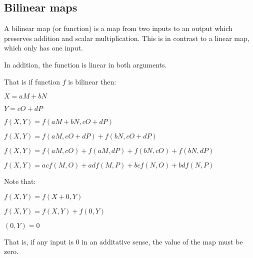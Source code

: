 
\subsection{Bilinear maps}

A bilinear map (or function) is a map from two inputs to an output which preserves addition and scalar multiplication. This is in contrast to a linear map, which only has one input.

In addition, the function is linear in both arguments.

That is if function \(f\) is bilinear then:

$X=aM+bN$

$Y=cO+dP$

$f(X,Y)=f(aM+bN,cO+dP)$

$f(X,Y)=f(aM,cO+dP)+f(bN,cO+dP)$

$f(X,Y)=f(aM,cO)+f(aM,dP)+f(bN,cO)+f(bN,dP)$

$f(X,Y)=acf(M,O)+adf(M,P)+bcf(N,O)+bdf(N,P)$

Note that:

$f(X,Y)=f(X+0,Y)$

$f(X,Y)=f(X,Y)+f(0,Y)$

$(0,Y)=0$

That is, if any input is \(0\) in an additative sense, the value of the map must be zero.

